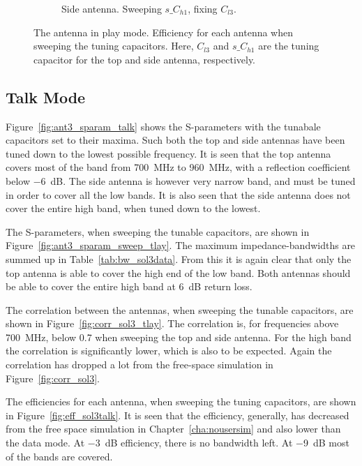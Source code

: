 \begin{figure}[htbp]
\begin{subfigure}{0.49\linewidth}
        \caption{Side antenna. Sweeping $s\_C_{h1}$, fixing $C_{l3}$.}
    \end{subfigure}
    \caption{The antenna in play mode. Efficiency for each antenna when sweeping the tuning capacitors. Here, $C_{l3}$ and $s\_C_{h1}$ are the tuning capacitor for the top and side antenna, respectively.}
    \label{fig:eff_sol3play}
\end{figure}

\FloatBarrier
\subsection{Talk Mode}
Figure~\ref{fig:ant3_sparam_talk} shows the S-parameters with the tunabale capacitors set to their maxima. Such both the top and side antennas have been tuned down to the lowest possible frequency. It is seen that the top antenna covers most of the band from \SI{700}{MHz} to \SI{960}{MHz}, with a reflection coefficient below \SI{-6}{dB}. The side antenna is however very narrow band, and must be tuned in order to cover all the low bands. It is also seen that the side antenna does not cover the entire high band, when tuned down to the lowest. 

The S-parameters, when sweeping the tunable capacitors, are shown in Figure~\ref{fig:ant3_sparam_sweep_tlay}. The maximum impedance-bandwidths are summed up in Table~\ref{tab:bw_sol3data}. From this it is again clear that only the top antenna is able to cover the high end of the low band. Both antennas should be able to cover the entire high band at \SI{6}{dB} return loss.

The correlation between the antennas, when sweeping the tunable capacitors, are shown in Figure~\ref{fig:corr_sol3_tlay}. The correlation is, for frequencies above \SI{700}{MHz}, below 0.7 when sweeping the top and side antenna. For the high band the correlation is significantly lower, which is also to be expected. Again the correlation has dropped a lot from the free-space simulation in Figure~\ref{fig:corr_sol3}.

The efficiencies for each antenna, when sweeping the tuning capacitors, are shown in Figure~\ref{fig:eff_sol3talk}. It is seen that the efficiency, generally, has decreased from the free space simulation in Chapter~\ref{cha:nousersim} and also lower than the data mode. At \SI{-3}{dB} efficiency, there is no bandwidth left. At \SI{-9}{dB} most of the bands are covered.


